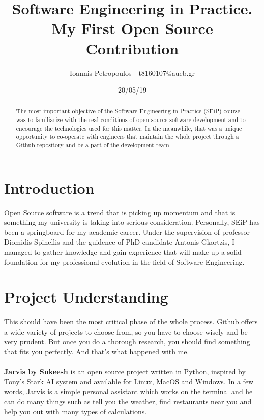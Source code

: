 \documentclass[12pt]{article}
\title{Software Engineering in Practice. My First Open Source Contribution}
\author{Ioannis Petropoulos - t8160107@aueb.gr}
\date{20/05/19}
\begin{document}
\maketitle

\begin{abstract}
  The most important objective of the Software Engineering in Practice (SEiP) course was to familiarize with the real conditions of open source software development and to encourage the technologies used for this matter. In the meanwhile, that was a unique opportunity to co-operate with engineers that maintain the whole project through a Github repository and be a part of the development team.  
\end{abstract}

\section*{Introduction}
   Open Source software is a trend that is picking up momentum \cite{Forbes} and that is something my university is taking into serious consideration. Personally, SEiP has been a springboard for my academic career. Under the supervision of professor Diomidis Spinellis and the guidence of PhD candidate Antonis Gkortzis, I managed to gather knowledge and gain experience that will make up a solid foundation for my professional evolution in the field of Software Engineering.

\section{Project Understanding}

\paragraph{}
  This should have been the most critical phase of the whole process. Github offers a wide variety of projects to choose from, so you have to choose wisely and be very prudent. But once you do a thorough research, you should find something that fits you perfectly. And that's what happened with me.
  
\paragraph{}
  \textbf{Jarvis by Sukeesh} is an open source project written in Python, inspired by Tony's Stark AI system \cite{Jarvis} and available for Linux, MacOS and Windows. In a few words, Jarvis is a simple personal assistant which works on the terminal and he can do many things such as tell you the weather, find restaurants near you and help you out with many types of calculations.
\end{document}

